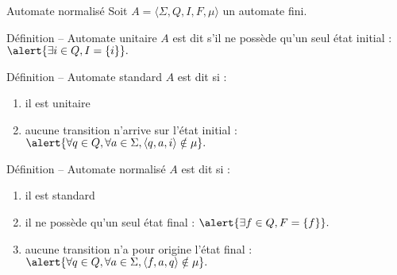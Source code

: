 
\begingroup

\begin{frame}{Automate normalisé}
\small 
  Soit $A = \langle \Sigma, Q, I, F, \mu\rangle$ un automate fini. 

  \begin{block}{Définition -- Automate unitaire}
    $A$ est dit  s'il ne possède qu'un seul état initial :
    $\alert{\exists i \in Q, I = \{i\}}.$
  \end{block}

  \begin{block}{Définition -- Automate standard}
    $A$ est dit  si :
    \begin{enumerate}
    \item il est \alert{unitaire}
    \item aucune transition n'arrive sur l'état initial :
    $\alert{\forall q\in Q, \forall a\in \Sigma, \langle q, a, i\rangle \notin \mu}.$
    \end{enumerate}
  \end{block}

  \begin{block}{Définition -- Automate normalisé}
    $A$ est dit  si :
    \begin{enumerate}
    \item il est \alert{standard}
    \item il ne possède qu'un seul état final : $\alert{\exists f \in Q, F = \{f\}}.$
    \item aucune transition n'a pour origine l'état final :
    $\alert{\forall q\in Q, \forall a\in \Sigma, \langle f, a, q\rangle \notin \mu}.$
    \end{enumerate}
  \end{block}
\end{frame}
\endgroup
